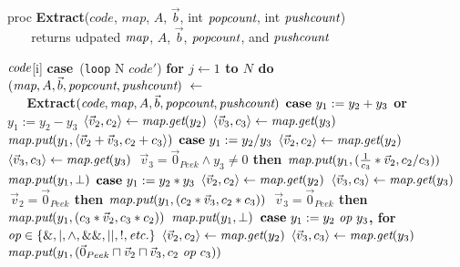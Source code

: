 \begin{algorithm}
proc {\bf Extract}($code$, $map$, $A$, $\vec b$, int $\mbox{\it popcount}$, int $\mbox{\it pushcount}$) \\
\verb+   + returns udpated $\mbox{\it map}$, $A$, ${\vec b}$, $\mbox{\it popcount}$, and $\mbox{\it pushcount}$ \\ \vspace{-12pt}
\begin{algorithmic}
 $\mbox{\it code}$[i]
\IND
\STATE \mbox{\bf case}~({\tt loop} N $code'$)
\IND
\STATE \bf{for} $j \leftarrow 1$ to $N$ {\bf do}
\IND
\STATE $(\mbox{\it map}, A, {\vec b}, \mbox{\it popcount}, \mbox{\it pushcount})~\leftarrow~$ \\
\verb+   +\bf{Extract}$(\mbox{\it code}, \mbox{\it map}, A, {\vec b}, \mbox{\it popcount}, \mbox{\it pushcount})$
\UND
\UND
\STATE \vspace{-6pt}
\STATE $\mbox{\bf case}~ y_1 := y_2 + y_3$ or $y_1 := y_2 - y_3$
\IND
\STATE $\langle{\vec v_2}, {c_2}\rangle \leftarrow \mbox{\it map}.\mbox{\it get}(y_2)$
\STATE $\langle{\vec v_3}, {c_3}\rangle \leftarrow \mbox{\it map}.\mbox{\it get}(y_3)$
\STATE $\mbox{\it map}.\mbox{\it put}(y_1, \langle{\vec v_2+\vec v_3}, {c_2+c_3}\rangle)$
\UND
\STATE \vspace{-6pt}
\STATE $\mbox{\bf case}~y_1 := y_2 / y_3$
\IND
\STATE $\langle{\vec v_2}, {c_2}\rangle \leftarrow \mbox{\it map}.\mbox{\it get}(y_2)$
\STATE $\langle{\vec v_3}, {c_3}\rangle \leftarrow \mbox{\it map}.\mbox{\it get}(y_3)$
 $~\vec v_3 = \vec 0_{Peek} \wedge y_3 \ne 0$ {\bf then}
\IND
\STATE $\mbox{\it map}.\mbox{\it put}(y_1, (\frac{1}{c_3}*\vec v_2, c_2/c_3))$
\UND
{}
\IND
\STATE $\mbox{\it map}.\mbox{\it put}(y_1, \bot)$
\UND
\UND
\STATE \vspace{-6pt}
\STATE $\mbox{\bf case}~y_1 := y_2 * y_3$
\IND
\STATE $\langle{\vec v_2}, {c_2}\rangle \leftarrow \mbox{\it map}.\mbox{\it get}(y_2)$
\STATE $\langle{\vec v_3}, {c_3}\rangle \leftarrow \mbox{\it map}.\mbox{\it get}(y_3)$
 $~\vec v_2 = \vec 0_{Peek}$ {\bf then}
\IND
\STATE $\mbox{\it map}.\mbox{\it put}(y_1, (c_2*\vec v_3, c_2*c_3))$
\UND
{} $~\vec v_3=\vec 0_{Peek}$ {\bf then}
\IND
\STATE $\mbox{\it map}.\mbox{\it put}(y_1, (c_3*\vec v_2, c_3*c_2))$
\UND
{}
\IND
\STATE $\mbox{\it map}.\mbox{\it put}(y_1, \bot)$
\UND
\UND
\STATE \vspace{-6pt}
\STATE $\mbox{\bf case}~y_1 := y_2 ~\mbox{\it op}~ y_3$, for $\mbox{\it op} \in \{\&, |, \wedge, \&\&, ||, !, \mbox{\it etc.}\}$
\IND
\STATE $\langle{\vec v_2}, {c_2}\rangle \leftarrow \mbox{\it map}.\mbox{\it get}(y_2)$
\STATE $\langle{\vec v_3}, {c_3}\rangle \leftarrow \mbox{\it map}.\mbox{\it get}(y_3)$
\STATE $\mbox{\it map}.\mbox{\it put}(y_1, (\vec 0_{Peek} \sqcap \vec v_2 \sqcap \vec v_3, c_2 ~\mbox{\it op}~ c_3))$
\UND
\STATE \vspace{-6pt}

\end{algorithmic}
\end{algorithm}
